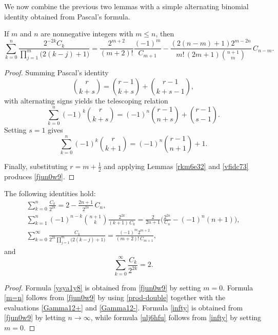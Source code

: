 \documentclass[12pt,reqno]{article}
\begin{document}
We now combine the previous two lemmas with a simple alternating binomial identity obtained from Pascal's formula.
\begin{proposition}
If $m$ and $n$ are nonnegative integers with $m\leq n$, then
\begin{equation}\label{fjun0w9}
\sum_{k = 0}^n \frac{2^{-2k}C_k}{\prod\limits_{j = 1}^m \!{\big(2(k - j) + 1\big)}} = \frac{2^{m + 2}}{(m + 2)!}\frac{(- 1)^m}{C_{m + 1}} 
- \frac{( 2(n -m) + 1) 2^{m-2n}}{m!\,( 2m + 1 )\binom{n+1}{m}}\, C_{n - m}.
\end{equation}
\end{proposition}
\begin{proof}
Summing Pascal's identity
\begin{equation}\label{pascal}
\binom r{k+s}=\binom{r-1}{k+s}+\binom{r-1}{k+s-1},
\end{equation}
with alternating signs yields the telescoping relation
\begin{equation}\label{cmaqeg5}
\sum_{k = 0}^n ( - 1)^k \binom{{r}}{{k + s}} = ( - 1)^n \binom{r-1}{n + s} + \binom{r-1}{s-1}.
\end{equation}
Setting $s=1$ gives
\begin{equation}\label{vtvra8b}
\sum_{k = 0}^n ( - 1)^k \binom{{r}}{{k + 1}} = ( - 1)^n \binom{r-1}{n + 1} + 1.
\end{equation}

Finally, substituting $r=m+\frac12 $ and applying Lemmas \ref{rkm6e32} and \ref{vfidc73} produces \eqref{fjun0w9}.
\end{proof}
\begin{corollary}
The following identities hold:
\begin{gather}
\sum_{k = 0}^n \frac{C_k}{2^{2k}} = 2-\frac{2n+1}{2^{2n}}\,C_n, \label{ysya1y8} \\
\sum_{k = 1}^n (-1)^{n-k}\binom{n+1}{k} \frac{2^{2k}}{(k+1)\,C_k} = \frac{2}{2n+1} \Big(\frac{2^{2n}}{C_n}-(-1)^n(n+1)\Big),\label{m=n} \\
\sum_{k = 0}^\infty \frac{C_k}{2^{2k}\prod\limits_{j = 1}^m \!\big(2(k-j)+1\big)}	= \frac{(-1)^m2^{m+2}}{(m+2)!\,C_{m+1}},\label{infty}
\end{gather}
and
\begin{equation}\label{ulj6hfu}
	\sum_{k = 0}^\infty \frac{C_k}{2^{2k}} = 2. 
\end{equation}
\end{corollary}
\begin{proof}
Formula \eqref{ysya1y8} is obtained from \eqref{fjun0w9} by setting $m=0$. Formula \eqref{m=n} follows from \eqref{fjun0w9} by using \eqref{prod-double} together with the evaluations \eqref{Gamma12+} and \eqref{Gamma12-}. Formula \eqref{infty} is obtained from \eqref{fjun0w9} by letting $n\to\infty$, while formula \eqref{ulj6hfu} follows from \eqref{infty} by setting $m=0$.
\end{proof}
\end{document}
